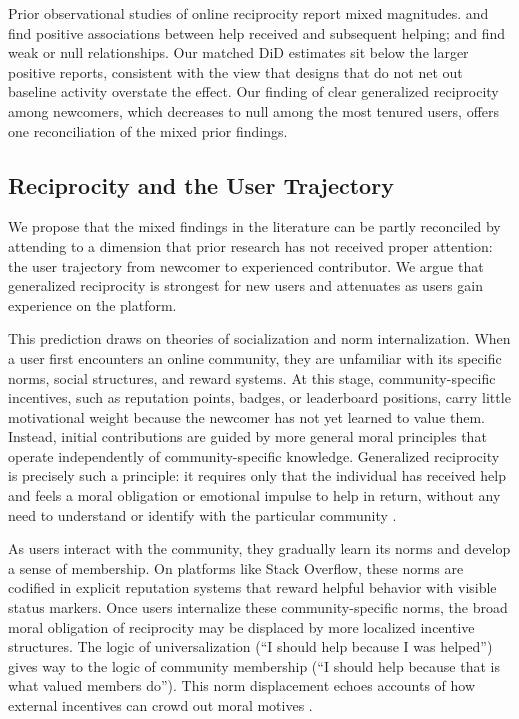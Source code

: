 Prior observational studies of online reciprocity report mixed magnitudes. \citet{baker_paying_2014} and \citet{chen_why_2019} find positive associations between help received and subsequent helping; \citet{wasko_why_2005} and \citet{joyce_predicting_2006} find weak or null relationships. Our matched DiD estimates sit below the larger positive reports, consistent with the view that designs that do not net out baseline activity overstate the effect. Our finding of clear generalized reciprocity among newcomers, which decreases to null among the most tenured users, offers one reconciliation of the mixed prior findings.

\subsection{Reciprocity and the User Trajectory}
\label{sec:trajectory}

We propose that the mixed findings in the literature can be partly reconciled by attending to a dimension that prior research has not received proper attention: the user trajectory from newcomer to experienced contributor. We argue that generalized reciprocity is strongest for new users and attenuates as users gain experience on the platform.

This prediction draws on theories of socialization and norm internalization. When a user first encounters an online community, they are unfamiliar with its specific norms, social structures, and reward systems. At this stage, community-specific incentives, such as reputation points, badges, or leaderboard positions, carry little motivational weight because the newcomer has not yet learned to value them. Instead, initial contributions are guided by more general moral principles that operate independently of community-specific knowledge. Generalized reciprocity is precisely such a principle: it requires only that the individual has received help and feels a moral obligation or emotional impulse to help in return, without any need to understand or identify with the particular community \citep{levine_logic_2020, curry_is_2019}.

As users interact with the community, they gradually learn its norms and develop a sense of membership. On platforms like Stack Overflow, these norms are codified in explicit reputation systems that reward helpful behavior with visible status markers. Once users internalize these community-specific norms, the broad moral obligation of reciprocity may be displaced by more localized incentive structures. The logic of universalization (``I should help because I was helped'') gives way to the logic of community membership (``I should help because that is what valued members do''). This norm displacement echoes accounts of how external incentives can crowd out moral motives \citep{benabou_incentives_2006}.

